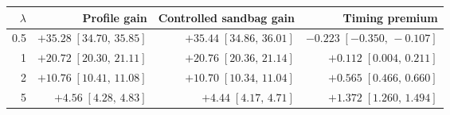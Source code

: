 \begin{tabular}{rrrr}
\toprule
$\lambda$ & Profile gain & Controlled sandbag gain & Timing premium \\
\midrule
0.5 & \(+35.28\;[34.70,\,35.85]\) & \(+35.44\;[34.86,\,36.01]\) & \(-0.223\;[-0.350,\,-0.107]\) \\
1 & \(+20.72\;[20.30,\,21.11]\) & \(+20.76\;[20.36,\,21.14]\) & \(+0.112\;[0.004,\,0.211]\) \\
2 & \(+10.76\;[10.41,\,11.08]\) & \(+10.70\;[10.34,\,11.04]\) & \(+0.565\;[0.466,\,0.660]\) \\
5 & \(+4.56\;[4.28,\,4.83]\) & \(+4.44\;[4.17,\,4.71]\) & \(+1.372\;[1.260,\,1.494]\) \\
\bottomrule
\end{tabular}
